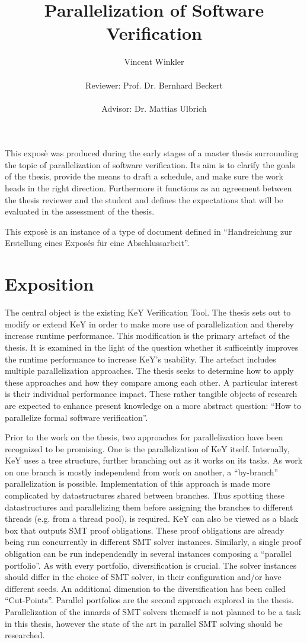 \documentclass{scrartcl}
\title{Parallelization of Software Verification}
\author{
    Vincent Winkler\\
    \vspace{1em}\\
    Reviewer: Prof. Dr. Bernhard Beckert\\
    \vspace{1em}\\
    Advisor: Dr. Mattias Ulbrich
}
\begin{document}
\maketitle

This exposè was produced during the early stages of a master thesis
surrounding the topic of parallelization of software verification.
Its aim is to clarify the goals of the thesis, provide the means to draft a schedule,
and make sure the work heads in the right direction.
Furthermore it functions as an agreement between the thesis reviewer and the student
and defines the expectations that will be evaluated in the assessment of the thesis.

This exposè is an instance of a type of document defined in
\enquote{Handreichung zur Erstellung eines Exposés für eine Abschlussarbeit}.

\section{Exposition}
The central object is the existing KeY Verification Tool.
The thesis sets out to modify or extend KeY in order to make more use of parallelization
and thereby increase runtime performance.
This modification is the primary artefact of the thesis.
It is examined in the light of the question whether it sufficeintly improves the runtime
performance to increase KeY's usability.
The artefact includes multiple parallelization approaches.
The thesis seeks to determine how to apply these approaches
and how they compare among each other.
A particular interest is their individual performance impact.
These rather tangible objects of research are expected
to enhance present knowledge on a more abstract question:
\enquote{How to parallelize formal software verification}.

Prior to the work on the thesis,
two approaches for parallelization have been recognized to be promising.
One is the parallelization of KeY itself.
Internally, KeY uses a tree structure, further branching out as it works on its tasks.
As work on one branch is mostly independend from work on another,
a \enquote{by-branch} parallelization is possible.
Implementation of this approach is made more complicated
by datastructures shared between branches.
Thus spotting these datastructures and parallelizing them
before assigning the branches to different threads (e.g. from a thread pool),
is required.
KeY can also be viewed as a black box that outputs SMT proof obligations.
These proof obligations are already being run concurrently in different SMT solver instances.
Similarly, a single proof obligation can be run independendly in several instances
composing a \enquote{parallel portfolio}.
As with every portfolio, diversification is crucial.
The solver instances should differ in the choice of SMT solver,
in their configuration and/or have different seeds.
An additional dimension to the diversification has been called \enquote{Cut-Points}.
Parallel portfolios are the second approach explored in the thesis.
Parallelization of the innards of SMT solvers themself is not planned to be a task in this thesis,
however the state of the art in parallel SMT solving should be researched.
\end{document}
